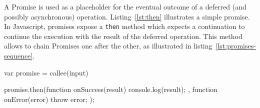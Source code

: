 

A Promise is used as a placeholder for the eventual outcome of a deferred (and possibly asynchronous) operation.
Listing~\ref{lst:then} illustrates a simple promise.
In Javascript, promises expose a \texttt{then} method which expects a continuation to continue the execution with the result of the deferred operation. %
This method allows to chain Promises one after the other, as illustrated in listing~\ref{lst:promises-sequence}.



\begin{code}[js, %
             caption={Example of a Promise}, %
             label={lst:then}] %
var promise = callee(input)

promise.then(function onSuccess(result) {
  console.log(result);
}, function onError(error) {
  throw error;
});
\end{code}

